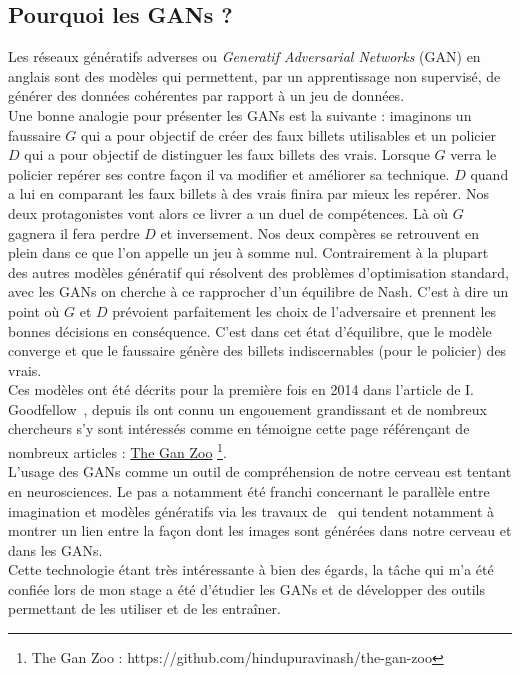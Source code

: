 \documentclass[11pt,francais]{article}
\begin{document}
\subsection{Pourquoi les GANs ?}
\label{sec:Intro}
Les réseaux génératifs adverses ou \textit{Generatif Adversarial Networks} (GAN) en anglais sont des modèles qui permettent, par un apprentissage non supervisé, de générer des données cohérentes par rapport à un jeu de données.\\
Une bonne analogie pour présenter les GANs est la suivante : imaginons un faussaire \(G\) qui a pour objectif de créer des faux billets utilisables et un policier \(D\) qui a pour objectif de distinguer les faux billets des vrais.
Lorsque \(G\) verra le policier repérer ses contre façon il va modifier et améliorer sa technique. \(D\) quand a lui en comparant les faux billets à des vrais finira par mieux les repérer. Nos deux protagonistes vont alors ce livrer a un duel de compétences. Là où \(G\) gagnera il fera perdre \(D\) et inversement. Nos deux compères se retrouvent en plein dans ce que l'on appelle un jeu à somme nul. Contrairement à la plupart des autres modèles génératif qui résolvent des problèmes d'optimisation standard, avec les GANs on cherche à ce rapprocher d'un équilibre de Nash. C'est à dire un point où \(G\) et \(D\) prévoient parfaitement les choix de l'adversaire et prennent les bonnes décisions en conséquence. C'est dans cet état d'équilibre, que le modèle converge et que le faussaire génère des billets indiscernables (pour le policier) des vrais.\\
Ces modèles ont été décrits pour la première fois en 2014 dans l'article de I. Goodfellow~\cite{NIPS2014_5423}, depuis ils ont connu un engouement grandissant et de nombreux chercheurs s'y sont intéressés comme en témoigne cette page référençant de nombreux articles : \href{https://github.com/hindupuravinash/the-gan-zoo}{The Gan Zoo} \footnote{\label{note1}The Gan Zoo : https://github.com/hindupuravinash/the-gan-zoo}.\\ 
L'usage des GANs comme un outil de compréhension de notre cerveau est tentant en neurosciences. Le pas a notamment été franchi concernant le parallèle entre imagination et modèles génératifs via les travaux de~\cite{GAN_Brain_Signals} qui tendent notamment à montrer un lien entre la façon dont les images sont générées dans notre cerveau et dans les GANs. \\
Cette technologie étant très intéressante à bien des égards, la tâche qui m'a été confiée lors de mon stage a été d'étudier les GANs et de développer des outils permettant de les utiliser et de les entraîner.
\end{document}
